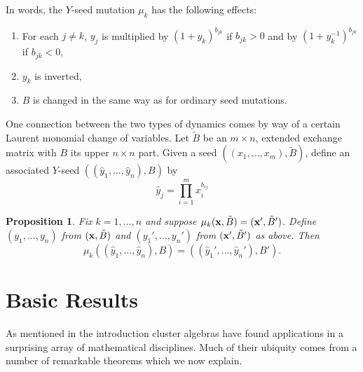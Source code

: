 \documentclass{amsart}
\newtheorem{proposition}[theorem]{Proposition}
\theoremstyle{definition}
\theoremstyle{remark}
\numberwithin{equation}{section}
\newcommand{\x}{{\bf x}}
\begin{document}
	In words, the $Y$-seed mutation $\mu_k$ has the following effects:
	\begin{enumerate}
	\item For each $j \neq k$, $y_j$ is multiplied by $(1+y_k)^{b_{jk}}$ if $b_{jk}>0$ and by $(1+y_k^{-1})^{b_{jk}}$ if $b_{jk}<0$,
	\item $y_k$ is inverted,
	\item $B$ is changed in the same way as for ordinary seed mutations.
	\end{enumerate}
	
	One connection between the two types of dynamics comes by way of a certain Laurent monomial change of variables.  Let $\tilde{B}$ be an $m \times n$, extended exchange matrix with $B$ its upper $n \times n$ part.  Given a seed $((x_1,\ldots, x_m),\tilde{B})$, define an associated $Y$-seed $((\hat{y}_1,\ldots, \hat{y}_n),B)$ by
	\begin{displaymath}
	\hat{y}_j = \prod_{i=1}^m x_i^{b_{ij}}
	\end{displaymath}
	
	\begin{proposition}
	Fix $k=1,\ldots, n$ and suppose $\mu_k(\x,\tilde{B}) = (\x',\tilde{B}')$.  Define $(y_1,\ldots, y_n)$ from $(\x,\tilde{B})$ and $(y_1',\ldots, y_n')$ from $(\x',\tilde{B}')$ as above.  Then 
	\begin{displaymath}
	\mu_k((\hat{y}_1,\ldots, \hat{y}_n), B) = ((\hat{y}_1',\ldots, \hat{y}_n'), B').
	\end{displaymath}
	\end{proposition}

\section{Basic Results}\label{sec:basic_theorems}
  As mentioned in the introduction cluster algebras have found applications in a surprising array of mathematical disciplines.  Much of their ubiquity comes from a number of remarkable theorems which we now explain.
\end{document}

